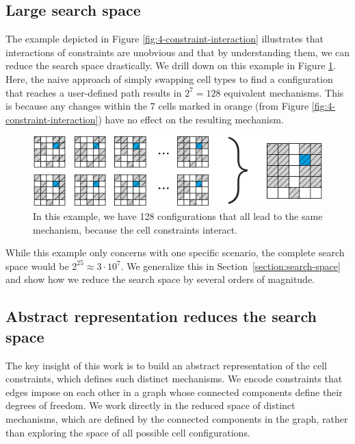 \subsection{Large search space}
The example depicted in Figure \ref{fig:4-constraint-interaction} illustrates that interactions of constraints are unobvious and that by understanding them, we can reduce the search space drastically. We drill down on this example in Figure \ref{fig:5-large-search-space}. Here, the naive approach of simply swapping cell types to find a configuration that reaches a user-defined path results in $2^7=128$ equivalent mechanisms. This is because any changes within the 7 cells marked in orange (from Figure \ref{fig:4-constraint-interaction}) have no effect on the resulting mechanism. 

\begin{figure} [h]
    \includegraphics[width=\textwidth]{chapters/understanding-metamaterial-mechanisms-FIG/5-large-search-space.pdf}
    \caption[Short figure name.]{In this example, we have 128 configurations that all lead to the same mechanism, because the cell constraints interact. 
    \label{fig:5-large-search-space}}
\end{figure}

While this example only concerns with one specific scenario, the complete search space would be $2^{25} \approx 3\cdot {10}^7$. We generalize this in Section~\ref{section:search-space} and show how we reduce the search space by several orders of magnitude.


\subsection{Abstract representation reduces the search space}

The key insight of this work is to build an abstract representation of the cell constraints, which defines such distinct mechanisms. We encode constraints that edges impose on each other in a graph whose connected components define their degrees of freedom. We work directly in the reduced space of distinct mechanisms, which are defined by the connected components in the graph, rather than exploring the space of all possible cell configurations. 


